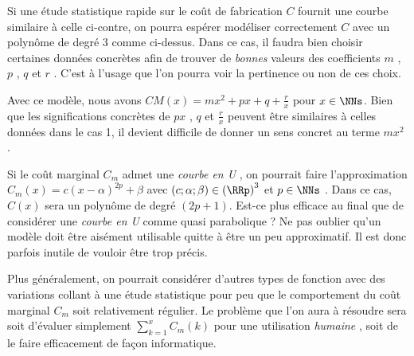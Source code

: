 Si une étude statistique rapide sur le coût de fabrication $C$ fournit une courbe similaire à celle ci-contre, on pourra espérer modéliser correctement $C$ avec un polynôme de degré 3 comme ci-dessus. Dans ce cas, il faudra bien choisir  certaines données concrètes afin de trouver de \emph{\og bonnes \fg} valeurs des coefficients $m$ , $p$ , $q$ et $r$ . C'est à l'usage que l'on pourra voir la pertinence ou non de ces choix.


\bigskip

Avec ce modèle, nous avons $CM(x) = m x^2 + p x + q + \frac{r}{x}$ pour $x \in \NNs$.
Bien que les significations concrètes de $p x$ , $q$  et $\frac{r}{x}$ peuvent être similaires à celles données dans le cas 1, il devient difficile de donner un sens concret au terme $m x^2$ .  




\begin{remark}
	Si le coût marginal $C_m$ admet une \emph{\og courbe en U \fg}, on pourrait faire l'approximation $C_m(x) = c (x - \alpha)^{2p} + \beta$ avec $(c ; \alpha ; \beta) \in \left( \RRp \right)^3$ et $p \in \NNs$ .
	Dans ce cas, $C(x)$ sera un polynôme de degré $(2p + 1)$. Est-ce plus efficace au final que de considérer une \emph{\og courbe en U \fg} comme quasi parabolique ?
	Ne pas oublier qu'un modèle doit être aisément utilisable quitte à être un peu approximatif. Il est donc parfois inutile de vouloir être trop précis.
\end{remark}




\begin{remark}
	Plus généralement, on pourrait considérer d'autres types de fonction avec des variations collant à une étude statistique pour peu que le comportement du coût marginal $C_m$ soit relativement régulier. Le problème que l'on aura à résoudre sera soit d'évaluer simplement $\displaystyle \sum_{k = 1}^{x} C_m(k)$ pour une utilisation \emph{\og humaine \fg}, soit de le faire efficacement de façon informatique.
\end{remark}
